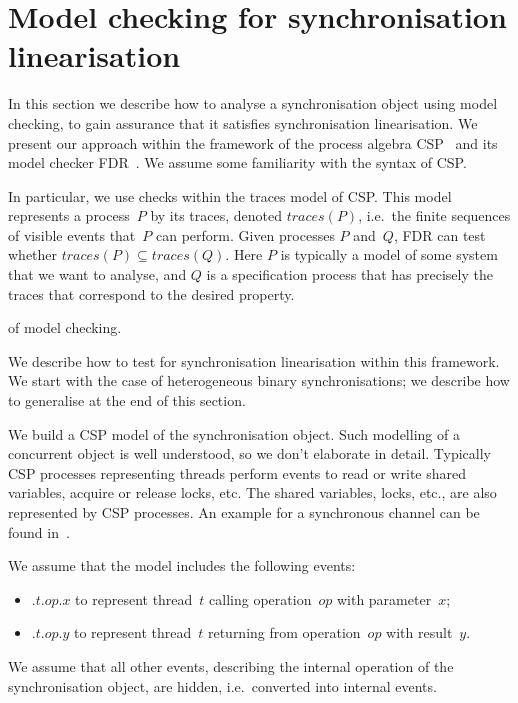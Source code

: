 \section{Model checking for synchronisation linearisation}
\label{sec:modelChecking}

In this section we describe how to analyse a synchronisation object using
model checking, to gain assurance that it satisfies synchronisation
linearisation.  We present our approach within the framework of the process
algebra CSP~\cite{awr:ucs} and its model checker FDR~\cite{fdr3,fdr-manual}.
We assume some familiarity with the syntax of CSP.

In particular, we use checks within the traces model of CSP\null.  This model
represents a process~$P$ by its traces, denoted $traces(P)$, i.e.~the finite
sequences of visible events that~$P$ can perform.  Given processes $P$
and~$Q$, FDR can test whether $traces(P) \subseteq traces(Q)$.  Here $P$ is
typically a model of some system that we want to analyse, and $Q$ is a
specification process that has precisely the traces that correspond to the
desired property.

 of model checking.

We describe how to test for synchronisation linearisation within this
framework.  We start with the case of heterogeneous binary synchronisations;
we describe how to generalise at the end of this section.

We build a CSP model of the synchronisation object.  Such modelling of a
concurrent object is well understood, so we don't elaborate in detail.
Typically CSP processes representing threads perform events to read or write
shared variables, acquire or release locks, etc.  The shared variables, locks,
etc., are also represented by CSP processes.  An example for a synchronous
channel can be found in~\cite{gavin:syncChan}.

We assume that the model includes the following events:
%
\begin{itemize}
\item {}$.t.op.x$ to represent thread~$t$ calling operation~$op$ with
  parameter~$x$; 

\item {}$.t.op.y$ to represent thread~$t$ returning from
  operation~$op$ with result~$y$.
\end{itemize}
%
We assume that all other events, describing the internal operation of the
synchronisation object, are hidden, i.e.~converted into internal events.

